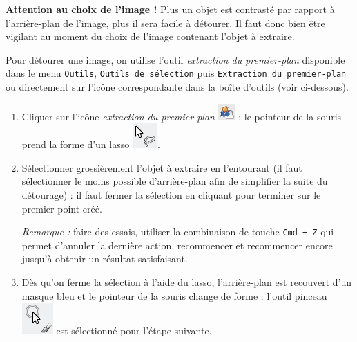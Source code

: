 

\textbf{Attention au choix de l'image !} Plus un objet est contrasté par rapport à l'arrière-plan de l'image, plus il sera facile à détourer. Il faut donc bien être vigilant au moment du choix de l'image contenant l'objet à extraire.

\vspace{6pt}

Pour détourer une image, on utilise l'outil \emph{extraction du premier-plan} disponible dans le menu \texttt{Outils}, \texttt{Outils de sélection} puis \texttt{Extraction du premier-plan} ou directement sur l'icône correspondante dans la boîte d'outils (voir ci-dessous).

\begin{enumerate}
\item Cliquer sur l'icône \emph{extraction du premier-plan} \includegraphics[width=.7cm]{./images/image03/iconeDetoure} : le pointeur de la souris prend la forme d'un lasso \includegraphics[width=.7cm]{./images/image03/iconeLasso}.
\item Sélectionner grossièrement l'objet à extraire en l'entourant (il faut sélectionner le moins possible d'arrière-plan afin de simplifier la suite du détourage) : il faut fermer la sélection en cliquant pour terminer sur le premier point créé.

\vspace{6pt}

\emph{Remarque :} faire des essais, utiliser la combinaison de touche \texttt{Cmd + Z} qui permet d'annuler la dernière action, recommencer et recommencer encore jusqu'à obtenir un résultat satisfaisant.

\vspace{6pt}

\item Dès qu'on ferme la sélection à l'aide du lasso, l'arrière-plan est recouvert d'un masque bleu et le pointeur de la souris change de forme : l'outil pinceau \includegraphics[width=.7cm]{./images/image03/iconePinceau} est sélectionné pour l'étape suivante. 



\end{enumerate}
